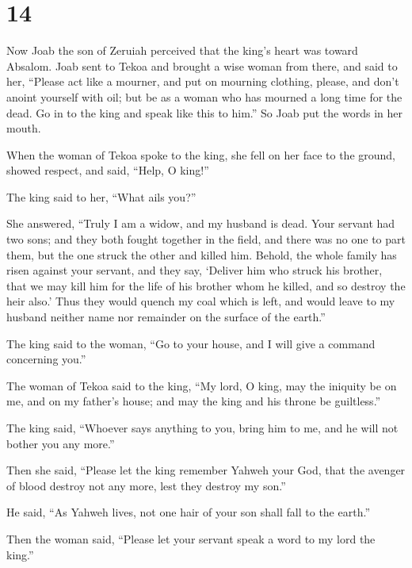 \hypertarget{section-13}{%
\section{14}\label{section-13}}

 Now Joab the son of Zeruiah perceived that the king's
heart was toward Absalom.  Joab sent to Tekoa and brought
a wise woman from there, and said to her, ``Please act like a mourner,
and put on mourning clothing, please, and don't anoint yourself with
oil; but be as a woman who has mourned a long time for the dead.
 Go in to the king and speak like this to him.'' So Joab
put the words in her mouth.

 When the woman of Tekoa spoke to the king, she fell on
her face to the ground, showed respect, and said, ``Help, O king!''

 The king said to her, ``What ails you?''

She answered, ``Truly I am a widow, and my husband is dead.
 Your servant had two sons; and they both fought together
in the field, and there was no one to part them, but the one struck the
other and killed him.  Behold, the whole family has risen
against your servant, and they say, `Deliver him who struck his brother,
that we may kill him for the life of his brother whom he killed, and so
destroy the heir also.' Thus they would quench my coal which is left,
and would leave to my husband neither name nor remainder on the surface
of the earth.''

 The king said to the woman, ``Go to your house, and I
will give a command concerning you.''

 The woman of Tekoa said to the king, ``My lord, O king,
may the iniquity be on me, and on my father's house; and may the king
and his throne be guiltless.''

 The king said, ``Whoever says anything to you, bring him
to me, and he will not bother you any more.''

 Then she said, ``Please let the king remember Yahweh
your God, that the avenger of blood destroy not any more, lest they
destroy my son.''

He said, ``As Yahweh lives, not one hair of your son shall fall to the
earth.''

 Then the woman said, ``Please let your servant speak a
word to my lord the king.''

